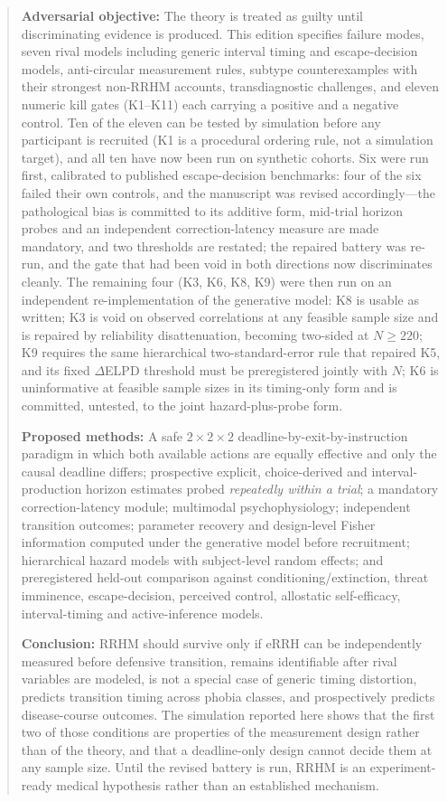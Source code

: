 \documentclass[9pt,twocolumn]{article}
\begin{document}
\begin{abstract}
\textbf{Adversarial objective:} The theory is treated as guilty until discriminating evidence is produced. This edition specifies failure modes, seven rival models including generic interval timing and escape-decision models, anti-circular measurement rules, subtype counterexamples with their strongest non-RRHM accounts, transdiagnostic challenges, and eleven numeric kill gates (K1--K11) each carrying a positive and a negative control. Ten of the eleven can be tested by simulation before any participant is recruited (K1 is a procedural ordering rule, not a simulation target), and all ten have now been run on synthetic cohorts. Six were run first, calibrated to published escape-decision benchmarks: four of the six failed their own controls, and the manuscript was revised accordingly---the pathological bias is committed to its additive form, mid-trial horizon probes and an independent correction-latency measure are made mandatory, and two thresholds are restated; the repaired battery was re-run, and the gate that had been void in both directions now discriminates cleanly. The remaining four (K3, K6, K8, K9) were then run on an independent re-implementation of the generative model: K8 is usable as written; K3 is void on observed correlations at any feasible sample size and is repaired by reliability disattenuation, becoming two-sided at $N\ge220$; K9 requires the same hierarchical two-standard-error rule that repaired K5, and its fixed $\Delta$ELPD threshold must be preregistered jointly with $N$; K6 is uninformative at feasible sample sizes in its timing-only form and is committed, untested, to the joint hazard-plus-probe form.

\textbf{Proposed methods:} A safe $2\times2\times2$ deadline-by-exit-by-instruction paradigm in which both available actions are equally effective and only the causal deadline differs; prospective explicit, choice-derived and interval-production horizon estimates probed \emph{repeatedly within a trial}; a mandatory correction-latency module; multimodal psychophysiology; independent transition outcomes; parameter recovery and design-level Fisher information computed under the generative model before recruitment; hierarchical hazard models with subject-level random effects; and preregistered held-out comparison against conditioning/extinction, threat imminence, escape-decision, perceived control, allostatic self-efficacy, interval-timing and active-inference models.

\textbf{Conclusion:} RRHM should survive only if eRRH can be independently measured before defensive transition, remains identifiable after rival variables are modeled, is not a special case of generic timing distortion, predicts transition timing across phobia classes, and prospectively predicts disease-course outcomes. The simulation reported here shows that the first two of those conditions are properties of the measurement design rather than of the theory, and that a deadline-only design cannot decide them at any sample size. Until the revised battery is run, RRHM is an experiment-ready medical hypothesis rather than an established mechanism.
\end{abstract}
\end{document}
